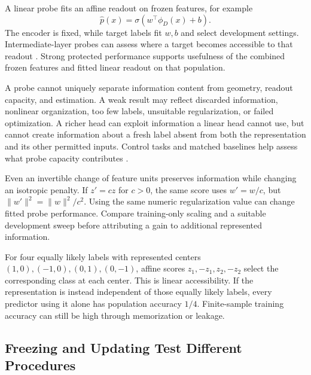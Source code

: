 A linear probe fits an affine readout on frozen features, for example
\[
\hat p(x)=\sigma(w^\top\phi_D(x)+b).
\]
The encoder is fixed, while target labels fit $w,b$ and select development settings. Intermediate-layer probes can assess where a target becomes accessible to that readout \citep{alain2016probes}. Strong protected performance supports usefulness of the combined frozen features and fitted linear readout on that population.

A probe cannot uniquely separate information content from geometry, readout capacity, and estimation. A weak result may reflect discarded information, nonlinear organization, too few labels, unsuitable regularization, or failed optimization. A richer head can exploit information a linear head cannot use, but cannot create information about a fresh label absent from both the representation and its other permitted inputs. Control tasks and matched baselines help assess what probe capacity contributes \citep{hewitt2019controlprobes}.

Even an invertible change of feature units preserves information while changing an isotropic penalty. If $z'=cz$ for $c>0$, the same score uses $w'=w/c$, but $\|w'\|^2=\|w\|^2/c^2$. Using the same numeric regularization value can change fitted probe performance. Compare training-only scaling and a suitable development sweep before attributing a gain to additional represented information.

For four equally likely labels with represented centers $(1,0),(-1,0),(0,1),(0,-1)$, affine scores $z_1,-z_1,z_2,-z_2$ select the corresponding class at each center. This is linear accessibility. If the representation is instead independent of those equally likely labels, every predictor using it alone has population accuracy $1/4$. Finite-sample training accuracy can still be high through memorization or leakage.

\subsection{Freezing and Updating Test Different Procedures}

